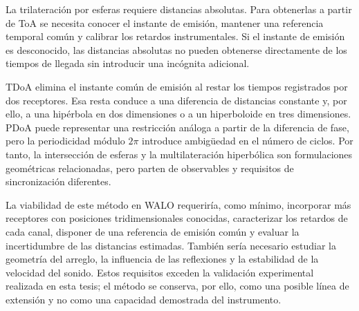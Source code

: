 La trilateración por esferas requiere distancias absolutas. Para
obtenerlas a partir de ToA se necesita conocer el instante de emisión,
mantener una referencia temporal común y calibrar los retardos
instrumentales. Si el instante de emisión es desconocido, las
distancias absolutas no pueden obtenerse directamente de los tiempos
de llegada sin introducir una incógnita adicional.

TDoA elimina el instante común de emisión al restar los tiempos
registrados por dos receptores. Esa resta conduce a una diferencia de
distancias constante y, por ello, a una hipérbola en dos dimensiones
o a un hiperboloide en tres dimensiones. PDoA puede representar una
restricción análoga a partir de la diferencia de fase, pero la
periodicidad módulo $2\pi$ introduce ambigüedad en el número de ciclos.
Por tanto, la intersección de esferas y la multilateración hiperbólica
son formulaciones geométricas relacionadas, pero parten de observables
y requisitos de sincronización diferentes.

La viabilidad de este método en WALO requeriría, como mínimo,
incorporar más receptores con posiciones tridimensionales conocidas,
caracterizar los retardos de cada canal, disponer de una referencia
de emisión común y evaluar la incertidumbre de las distancias
estimadas. También sería necesario estudiar la geometría del arreglo,
la influencia de las reflexiones y la estabilidad de la velocidad
del sonido. Estos requisitos exceden la validación experimental
realizada en esta tesis; el método se conserva, por ello, como una
posible línea de extensión y no como una capacidad demostrada del
instrumento.
